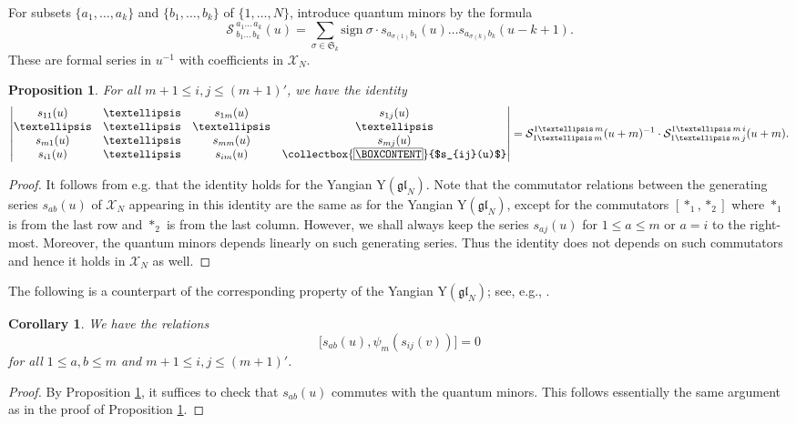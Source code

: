 \documentclass[11pt,reqno]{amsart}
\newcommand{\mybox}{%
    \collectbox{%
        \setlength{\fboxsep}{1pt}%
        \fbox{\BOXCONTENT}%
    }%
}
\numberwithin{equation}{section}
\newtheorem{prop}[thm]{Proposition}
\newtheorem{cor}[thm]{Corollary}
\theoremstyle{definition}
\theoremstyle{remark}
\newcommand{\be}{\begin{equation*}}
\newcommand{\ee}{\end{equation*}}
\newcommand{\gl}{\mathfrak{gl}}
\newcommand{\fkS}{\mathfrak{S}}
\newcommand{\rY}{\mathrm{Y}}
\newcommand{\lle}{\leqslant}
\newcommand{\scrX}{{\mathscr{X}}}
\begin{document}
For subsets $\{a_1,\dots,a_k\}$ and $\{b_1,\dots,b_k\}$ of $\{1,\dots,N\}$,
introduce quantum minors by the formula
\be
{\mathcal S\,}^{a_1\dots\,a_k}_{b_1\dots\, b_k}(u)=
\sum_{ \sigma\in \fkS_k} \mathrm{sign}~\sigma\cdot s_{a_{ \sigma(1)}b_1}(u)\dots
s_{a_{ \sigma(k)}b_k}(u-k+1).
\ee
These are formal series in $u^{-1}$ with coefficients in $\scrX_{N}$. 

\begin{prop}\label{prop:quasiqua}
For all $m+1\leqslant i,j\leqslant (m+1)'$, we have the identity
\be
\left|\begin{matrix}
s_{11}(u)&\dots&s_{1m}(u)&s_{1j}(u)\\
\dots&\dots&\dots&\dots\\
s_{m1}(u)&\dots&s_{mm}(u)&s_{mj}(u)\\
s_{i1}(u)&\dots&s_{im}(u)&\mybox{$s_{ij}(u)$}
\end{matrix}\right|={\mathcal S}^{1\dots\, m}_{1\dots\, m}(u+m)^{-1}\cdot
{\mathcal S}^{1\dots\, m\, i}_{1\dots\, m\, j}(u+m).
\ee
\end{prop}
\begin{proof}
It follows from e.g. \cite[\S1.11]{Mol07} that the identity holds for the Yangian $\rY(\gl_N)$. Note that the commutator relations between the generating series $s_{ab}(u)$ of $\scrX_N$ appearing in this identity are the same as for the Yangian $\rY(\gl_N)$, except for the commutators $[*_1,*_2]$ where $*_1$ is from the last row and $*_2$ is from the last column. However, we shall always keep the series $s_{aj}(u)$ for $1\lle a\lle m$ or $a=i$ to the right-most. Moreover, the quantum minors depends linearly on such generating series. Thus the identity does not depends on such commutators and hence it holds in $\scrX_N$ as well. 
\end{proof}

The following is a counterpart of the corresponding property of the Yangian
$\rY(\gl_N)$; see, e.g., \cite{BK05}.

\begin{cor}\label{cor:commu}
We have the relations
\be
\big[s_{ab}(u),\psi_m(s_{ij}(v))\big]=0
\ee
for all $1\leqslant a,b\leqslant m$ and $m+1\leqslant i,j\leqslant (m+1)'$. 
\end{cor}
\begin{proof}
By Proposition \ref{prop:quasiqua}, it suffices to check that $s_{ab}(u)$ commutes with the quantum minors. This follows essentially the same argument as in the proof of Proposition \ref{prop:quasiqua}.
\end{proof}
\end{document}
